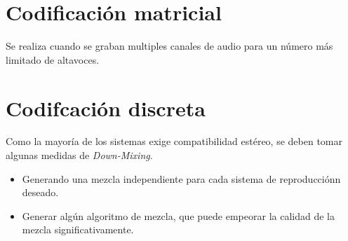 \documentclass[10pt]{book}
\begin{document}
\section{Codificación matricial}

Se realiza cuando se graban multiples canales de audio para un número más limitado de altavoces.

\section{Codifcación discreta}

Como la mayoría de los sistemas exige compatibilidad estéreo, se deben tomar algunas medidas de \textit{Down-Mixing}.
\begin{itemize}
  \item Generando una mezcla independiente para cada sistema de reproducciónn deseado.
  \item Generar algún algoritmo de mezcla, que puede empeorar la calidad de la mezcla significativamente.
\end{itemize}
\end{document}
